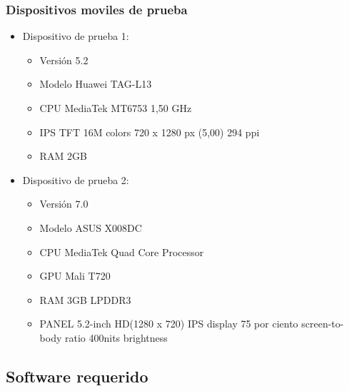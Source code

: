  	\subsubsection{Dispositivos moviles de prueba}
 		\begin{itemize}   		
			\item Dispositivo de prueba 1:
		   		\begin{itemize}
		   			\item Versión 5.2
		   			\item Modelo Huawei TAG-L13
		   			\item CPU MediaTek MT6753 1,50 GHz
		   			\item IPS TFT 16M colors 720 x 1280 px (5,00) 294 ppi
		   			\item RAM 2GB	   			
		   		\end{itemize}
   		
   			\item Dispositivo de prueba 2:
		   		\begin{itemize}
		   			\item Versión 7.0
		   			\item Modelo ASUS X008DC
		   			\item CPU MediaTek Quad Core Processor
		   			\item GPU Mali T720
		   			\item RAM 3GB LPDDR3
		   			\item PANEL 5.2-inch
		   			HD(1280 x 720) IPS display 
		   			75 por ciento screen-to-body ratio
		   			400nits brightness 
		   		\end{itemize}   		  		
   		\end{itemize}


\subsection{Software requerido}
